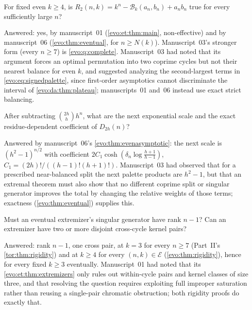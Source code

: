 \documentclass[11pt,a4paper]{article}
\numberwithin{equation}{section}
\theoremstyle{definition}
\theoremstyle{remark}
\newcommand{\Bip}{\mathcal B}
\begin{document}
\begin{question}\label{evo:q:evenexact}
For fixed even $k\ge4$, is $R_2(n,k)=k^n-\Bip_k(a_n,b_n)+a_nb_n$ true for
every sufficiently large $n$?
\end{question}
Answered: yes, by manuscript~01 (\cref{evo:et:thm:main}, non-effective) and by
manuscript~06 (\cref{evo:thm:eventual}, for $n\ge N(k)$). Manuscript~03's
stronger form (every $n\ge7$) is \cref{evo:q:complete}. Manuscript~03 had
noted that its argument forces an optimal permutation into two coprime cycles
but not their nearest balance for even $k$, and suggested analyzing the
second-largest terms in \eqref{evo:eq:signedpalette}, since first-order
asymptotics cannot discriminate the interval of \cref{evo:da:thm:plateau};
manuscripts~01 and~06 instead use exact strict balancing.

\begin{question}\label{evo:q:evensecond}
After subtracting $\binom{2h}{h}h^n$, what are the next exponential scale and
the exact residue-dependent coefficient of $D_{2h}(n)$?
\end{question}
Answered by manuscript~06's \cref{evo:thm:evenasymptotic}: the next scale is
$(h^2-1)^{n/2}$ with coefficient
$2C_1\cosh(\delta_n\log\frac{h+1}{h-1})$, $C_1=(2h)!/((h-1)!(h+1)!)$.
Manuscript~03 had observed that for a prescribed near-balanced split the next
palette products are $h^2-1$, but that an extremal theorem must also show
that no different coprime split or singular generator improves the total by
changing the relative weights of those terms; exactness
(\cref{evo:thm:eventual}) supplies this.

\begin{question}\label{evo:q:rank}
Must an eventual extremizer's singular generator have rank $n-1$? Can an
extremizer have two or more disjoint cross-cycle kernel pairs?
\end{question}
Answered: rank $n-1$, one cross pair, at $k=3$ for every $n\ge7$ (Part~II's
\cref{tor:thm:rigidity}) and at $k\ge4$ for every $(n,k)\in\mathcal E$
(\cref{evo:thm:rigidity}), hence for every fixed $k\ge3$ eventually.
Manuscript~01 had noted that its \cref{evo:et:thm:extremizers} only rules out
within-cycle pairs and kernel classes of size three, and that resolving the
question requires exploiting full improper saturation rather than reusing a
single-pair chromatic obstruction; both rigidity proofs do exactly that.
\end{document}
